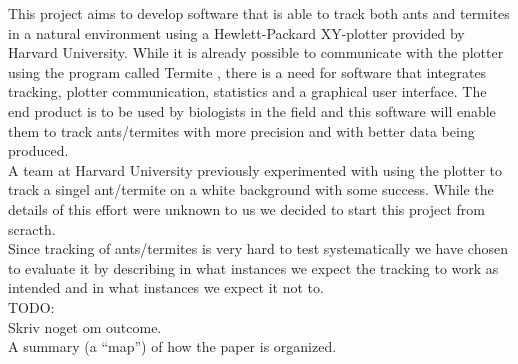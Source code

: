 This project aims to develop software that is able to track both ants and termites in a natural environment using a Hewlett-Packard XY-plotter provided by Harvard University. While it is already possible to communicate with the plotter using the program called Termite \cite{termite}, there is a need for software that integrates tracking, plotter communication, statistics and a graphical user interface. The end product is to be used by biologists in the field and this software will enable them to track ants/termites with more precision and with better data being produced.\\

A team at Harvard University previously experimented with using the plotter to track a singel ant/termite on a white background with some success. While the details of this effort were unknown to us we decided to start this project from scracth. \\

Since tracking of ants/termites is very hard to test systematically we have chosen to evaluate it by describing in what instances we expect the tracking to work as intended and in what instances we expect it not to. \\

TODO: \\
Skriv noget om outcome. \\
A summary (a “map”) of how the paper is organized.\\



